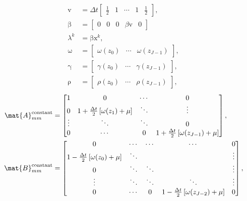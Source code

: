 \documentclass{jpmarticle}
\renewcommand{\vec}[1]{\boldsymbol{\mathrm{#1}}}
\begin{document}
\begin{equation}
  \begin{split}
    \vec{v} &=
    \Delta t
    \begin{bmatrix}
      \frac{1}{2} & 1 & \cdots & 1 & \frac{1}{2}
    \end{bmatrix},
    \\
    \vec{\beta} &=
    \begin{bmatrix}
      \vec{0} & 0 & \vec{0} & \beta \vec{v} & 0
    \end{bmatrix}
    \\
    \lambda^k &=
    \vec{\beta} \vec{x}^k,
    \\
    \vec{\omega} &=
    \begin{bmatrix}
      \omega(z_0) & \cdots & \omega(z_{J - 1})
    \end{bmatrix},
    \\
    \vec{\gamma} &=
    \begin{bmatrix}
      \gamma(z_0) & \cdots & \gamma(z_{J - 1})
    \end{bmatrix},
    \\
    \vec{\rho} &=
    \begin{bmatrix}
      \rho(z_0) & \cdots & \rho(z_{J - 1})
    \end{bmatrix},
  \end{split}
\end{equation}
\begin{equation}
  \begin{split}
    \mat{A}_{mm}^{\text{constant}} &=
    \begin{bmatrix}
      1 & 0 & \cdots & 0
      \\
      0 & 1 + \frac{\Delta t}{2} \left[\omega(z_1) + \mu\right] &
      \ddots & \vdots
      \\
      \vdots & \ddots & \ddots & 0
      \\
      0 & \cdots & 0 &
      1 + \frac{\Delta t}{2} \left[\omega(z_{J - 1}) + \mu\right]
    \end{bmatrix},
    \\
    \mat{B}_{mm}^{\text{constant}} &=
    \begin{bmatrix}
      0 & \cdots & \cdots & \cdots & 0
      \\
      1 - \frac{\Delta t}{2} \left[\omega(z_0) + \mu\right] & \ddots &
      & & \vdots
      \\
      0 & \ddots & \ddots & & \vdots
      \\
      \vdots & \ddots & \ddots & \ddots & \vdots
      \\
      0 & \cdots & 0 &
      1 - \frac{\Delta t}{2} \left[\omega(z_{J - 2}) + \mu\right] & 0
    \end{bmatrix},
  \end{split}
\end{equation}
\end{document}
